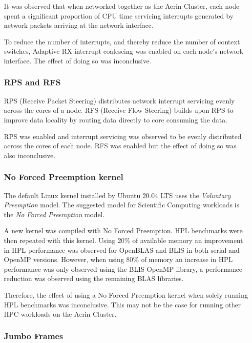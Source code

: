 It was observed that when networked together as the Aerin Cluster, each node spent a significant proportion of CPU time servicing interrupts generated by network packets arriving at the network interface.

To reduce the number of interrupts, and thereby reduce the number of context switches, Adaptive RX interrupt coalescing was enabled on each node's network interface. The effect of doing so was inconclusive. 


\subsubsection{RPS and RFS}

RPS (Receive Packet Steering) distributes network interrupt servicing evenly across the cores of a node. RFS (Receive Flow Steering) builds upon RPS to improve data locality by routing data directly to core consuming the data.

RPS was enabled and interrupt servicing was observed to be evenly distributed across the cores of each node. RFS was enabled but the effect of doing so was also inconclusive.


\subsubsection{No Forced Preemption kernel}

The default Linux kernel installed by Ubuntu 20.04 LTS uses the \emph{Voluntary Preemption} model. The suggested model for Scientific Computing workloads is the \emph{No Forced Preemption} model.

A new kernel was compiled with No Forced Preemption. HPL benchmarks were then repeated with this kernel. Using 20\% of available memory an improvement in HPL performance was observed for OpenBLAS and BLIS in both serial and OpenMP versions. However, when using 80\% of memory an increase in HPL performance was only observed using the BLIS OpenMP library, a performance reduction was observed using the remaining BLAS libraries.

Therefore, the effect of using a No Forced Preemption kernel when solely running HPL benchmarks was inconclusive. This may not be the case for running other HPC workloads on the Aerin Cluster.


\subsubsection{Jumbo Frames}



